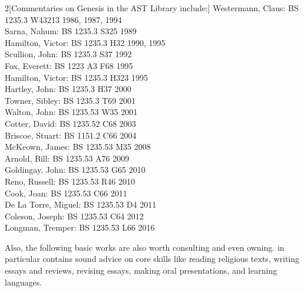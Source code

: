 \documentclass[titlepage]{article}
\begin{document}
\begin{multicols}{2}[Commentaries on Genesis in the AST Library include:]
Westermann, Claus: {\scshape BS 1235.3 W43213 1986, 1987, 1994}\\
Sarna, Nahum: {\scshape BS 1235.3 S325 1989}\\
Hamilton, Victor: {\scshape BS 1235.3 H32 1990, 1995}\\
Scullion, John: {\scshape BS 1235.3 S37 1992}\\
Fox, Everett: {\scshape BS 1223 A3 F68 1995}\\
Hamilton, Victor: {\scshape BS 1235.3 H323 1995}\\
Hartley, John: {\scshape BS 1235.3 H37 2000}\\
Towner, Sibley: {\scshape BS 1235.3 T69 2001}\\
Walton, John: {\scshape BS 1235.53 W35 2001}\\
Cotter, David: {\scshape BS 1235.52 C68 2003}\\
Briscoe, Stuart: {\scshape BS 1151.2 C66 2004}\\
McKeown, James: {\scshape BS 1235.53 M35 2008}\\
Arnold, Bill: {\scshape BS 1235.53 A76 2009}\\
Goldingay, John: {\scshape BS 1235.53 G65 2010}\\
Reno, Russell: {\scshape BS 1235.53 R46 2010}\\
Cook, Joan: {\scshape BS 1235.53 C66 2011}\\
De La Torre, Miguel: {\scshape BS 1235.53 D4 2011}\\
Coleson, Joseph: {\scshape BS 1235.53 C64 2012}\\
Longman, Tremper: {\scshape BS 1235.53 L66 2016}
\end{multicols}

Also, the following basic works are also worth consulting and even owning.
\cite{rlgs} in particular contains sound advice on core skills like
reading religious texts, writing essays and reviews, revising essays,
making oral presentations, and learning languages.
\end{document}
